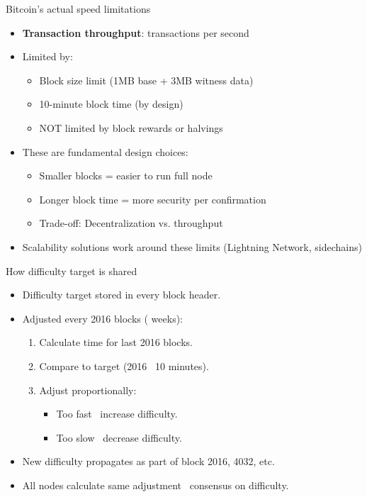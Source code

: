 \documentclass[aspectratio=169, lualatex, handout]{beamer}
\begin{document}
\begin{frame}{Bitcoin's actual speed limitations}
	\begin{itemize}
		\item \textbf{Transaction throughput}:  transactions per second
		\item Limited by:
		      \begin{itemize}
			      \item Block size limit (1MB base + 3MB witness data)
			      \item 10-minute block time (by design)
			      \item NOT limited by block rewards or halvings
		      \end{itemize}
		\item These are fundamental design choices:
		      \begin{itemize}
			      \item Smaller blocks = easier to run full node
			      \item Longer block time = more security per confirmation
			      \item Trade-off: Decentralization vs. throughput
		      \end{itemize}
		\item Scalability solutions work around these limits (Lightning Network, sidechains)
	\end{itemize}
\end{frame}

\begin{frame}{How difficulty target is shared}
	\begin{itemize}
		\item Difficulty target stored in every block header.
		\item Adjusted every 2016 blocks ( weeks):
		      \begin{enumerate}
			      \item Calculate time for last 2016 blocks.
			      \item Compare to target (2016 \times\ 10 minutes).
			      \item Adjust proportionally:
			            \begin{itemize}
				            \item Too fast \rightarrow\ increase difficulty.
				            \item Too slow \rightarrow\ decrease difficulty.
			            \end{itemize}
		      \end{enumerate}
		\item New difficulty propagates as part of block 2016, 4032, etc.
		\item All nodes calculate same adjustment \rightarrow\ consensus on difficulty.
	\end{itemize}
\end{frame}
\end{document}

